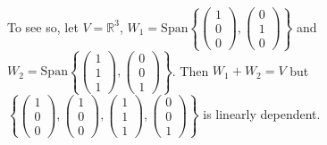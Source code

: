 \documentclass[12pt]{amsbook}
\begin{document}
To see so, let $V = \mathbb{R}^3$, $W_1 = \mathrm{Span}\left\{\begin{pmatrix} 1\\ 0\\0 \end{pmatrix}, \begin{pmatrix} 0\\ 1\\0 \end{pmatrix}\right\}$ and $W_2 = \mathrm{Span}\left\{\begin{pmatrix} 1\\ 1\\1 \end{pmatrix}, \begin{pmatrix} 0\\ 0\\1 \end{pmatrix}\right\}$. Then
$W_1 + W_2 = V$
but $\left\{\begin{pmatrix} 1\\ 0\\0 \end{pmatrix}, \begin{pmatrix} 1\\ 0\\0 \end{pmatrix}, \begin{pmatrix} 1\\ 1\\1 \end{pmatrix}, \begin{pmatrix} 0\\ 0\\1 \end{pmatrix}\right\}$ is linearly dependent.
\end{document}
